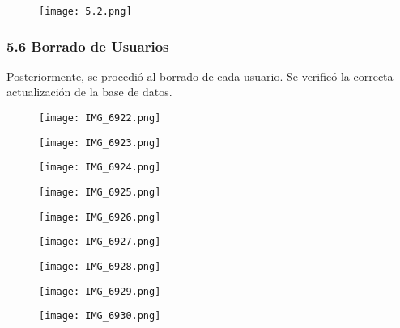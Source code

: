 \documentclass[12pt]{article}
\begin{document}
\begin{figure}[H]
    \centering
    \texttt{[image: 5.2.png]}
\end{figure}

\subsubsection{5.6 Borrado de Usuarios}
Posteriormente, se procedió al borrado de cada usuario. Se verificó la correcta actualización de la base de datos.

\begin{figure}[H]
    \centering
    \texttt{[image: IMG\_6922.png]}
\end{figure}

\begin{figure}[H]
    \centering
    \texttt{[image: IMG\_6923.png]}
\end{figure}

\begin{figure}[H]
    \centering
    \texttt{[image: IMG\_6924.png]}
\end{figure}

\begin{figure}[H]
    \centering
    \texttt{[image: IMG\_6925.png]}
\end{figure}

\begin{figure}[H]
    \centering
    \texttt{[image: IMG\_6926.png]}
\end{figure}

\begin{figure}[H]
    \centering
    \texttt{[image: IMG\_6927.png]}
\end{figure}

\begin{figure}[H]
    \centering
    \texttt{[image: IMG\_6928.png]}
\end{figure}

\begin{figure}[H]
    \centering
    \texttt{[image: IMG\_6929.png]}
\end{figure}

\begin{figure}[H]
    \centering
    \texttt{[image: IMG\_6930.png]}
\end{figure}
\end{document}
